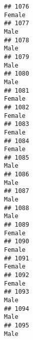 \documentclass[]{article}
\begin{document}
\begin{verbatim}
## 1076                                                                                                                          Female
## 1077                                                                                                                            Male
## 1078                                                                                                                            Male
## 1079                                                                                                                            Male
## 1080                                                                                                                            Male
## 1081                                                                                                                          Female
## 1082                                                                                                                          Female
## 1083                                                                                                                          Female
## 1084                                                                                                                          Female
## 1085                                                                                                                            Male
## 1086                                                                                                                            Male
## 1087                                                                                                                            Male
## 1088                                                                                                                            Male
## 1089                                                                                                                          Female
## 1090                                                                                                                          Female
## 1091                                                                                                                          Female
## 1092                                                                                                                          Female
## 1093                                                                                                                            Male
## 1094                                                                                                                            Male
## 1095                                                                                                                            Male

\end{verbatim}
\end{document}
